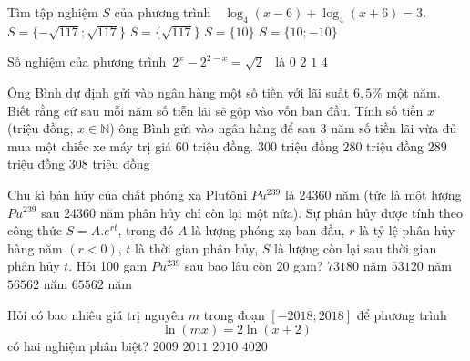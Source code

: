 \begin{ex}%
	Tìm tập nghiệm $S$ của phương trình\ \  $\log_4(x-6)+\log_4(x+6)=3$.
	\choice
	{$S=\{-\sqrt{117};\sqrt{117}\}$}
	{$S=\{\sqrt{117}\}$}
	{\True $S=\{10\}$}
	{$S=\{10;-10\}$}
\end{ex}

\begin{ex}%
	Số nghiệm của phương trình\ $2^x-2^{2-x}=\sqrt{2}$ \ là
	\choice
	{$0$}
	{$2$}
	{\True $1$}
	{$4$}
\end{ex}
\begin{ex}%
	Ông Bình dự định gửi vào ngân hàng một số tiền với lãi suất $6,5\%$ một năm. Biết rằng cứ sau mỗi năm số tiễn lãi sẽ gộp vào vốn ban đầu. Tính số tiền $x$ (triệu đồng, $x\in \mathbb N$) ông Bình gửi vào ngân hàng để sau 3 năm số tiền lãi vừa đủ mua một chiếc xe máy trị giá 60 triệu đồng.
	\choice
	{$300$ triệu đồng}
	{$280$ triệu đồng}
	{\True $289$ triệu đồng}
	{$308$ triệu đồng}
\end{ex}

\begin{ex}%
	Chu kì bán hủy của chất phóng xạ Plutôni $Pu^{239}$ là 24360 năm (tức là một lượng $Pu^{239}$ sau 24360 năm phân hủy chỉ còn lại một nửa). Sự phân hủy được tính theo công thức $S=A.e^{rt}$, trong đó $A$ là lượng phóng xạ ban đầu, $r$ là tỷ lệ phân hủy hàng năm $(r<0)$, $t$ là thời gian phân hủy, $S$ là lượng còn lại sau thời gian phân hủy $t$. Hỏi 100 gam $Pu^{239}$ sau bao lâu còn 20 gam?
	\choice
	{$73180$ năm}
	{$53120$ năm}
	{\True $56562$ năm}
	{$65562$ năm}
\end{ex}
\begin{ex}%
	Hỏi có bao nhiêu giá trị nguyên $m$ trong đoạn $[-2018;2018]$ để phương trình $$\ln(mx)=2\ln(x+2)$$ có hai nghiệm phân biệt?
	\choice
	{$2009$}
	{$2011$}
	{\True $2010$}
	{$4020$}
\end{ex}

